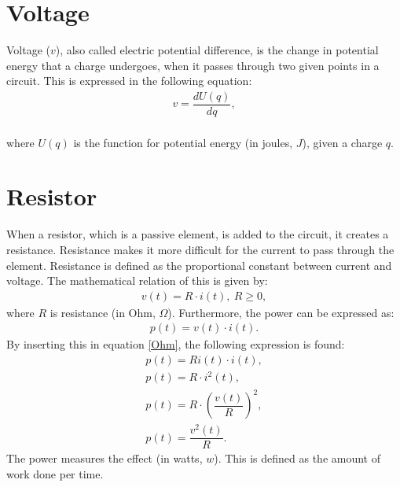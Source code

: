\section{Voltage}
Voltage ($v$), also called electric potential difference, is the change in potential energy that a charge undergoes, when it passes through two given points in a circuit. This is expressed in the following equation:
\begin{align}
	v=\dfrac{dU(q)}{dq},
\end{align}
\\
where $U(q)$ is the function for potential energy (in joules, $J$), given a charge $q$.
\section{Resistor}
When a resistor, which is a passive element, is added to the circuit, it creates a resistance. Resistance makes it more difficult for the current to pass through the element. Resistance is defined as the proportional constant between current and voltage. The mathematical relation of this is given by:
\begin{align} 
\label{Ohm}
v(t)=R\cdot i(t),\ R\geq0,
\end{align}
where $R$ is resistance (in Ohm, $\Omega$). Furthermore, the power can be expressed as: \cite[p. 25]{bcircuit} 
\begin{align} 
\label{power}
p(t)=v(t)\cdot i(t).
\end{align}
By inserting this in equation \eqref{Ohm}, the following expression is found:
\begin{align}
p(t)=Ri(t)\cdot i(t), \\
p(t)=R \cdot i^2(t), \\
p(t)=R \cdot \left(\dfrac{v(t)}{R} \right)^2, \\
p(t)=\dfrac{v^2(t)}{R}. \label{resistor:power}
\end{align}
The power measures the effect (in watts, $w$). This is defined as the amount of work done per time. 
